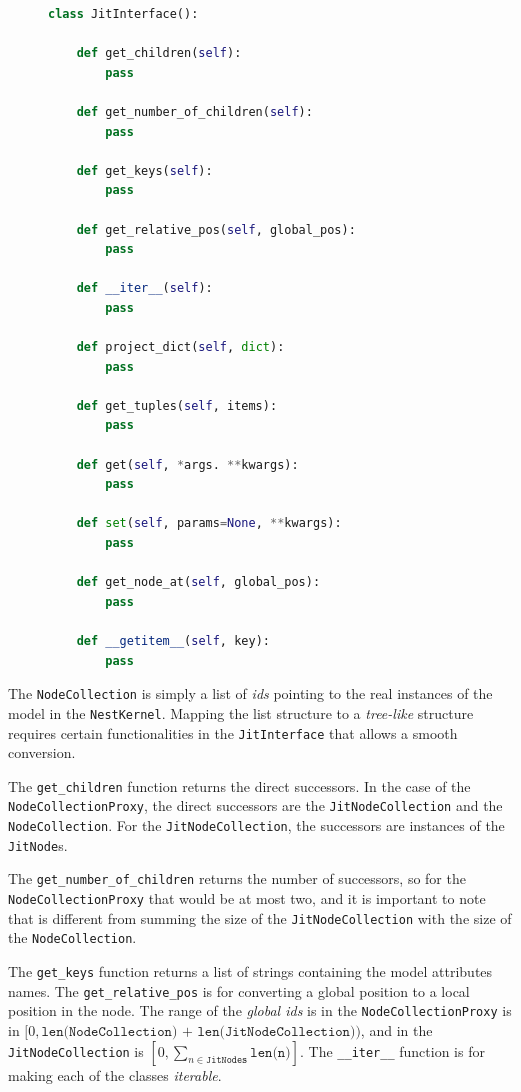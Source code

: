 \begin{figure}[ht!]
\centering
\begin{lstlisting}[language=Python, label=lst:jit_interface, caption={The JitInterface}]
class JitInterface():

    def get_children(self):
        pass
        
    def get_number_of_children(self):
        pass
    
    def get_keys(self):
        pass
    
    def get_relative_pos(self, global_pos):
        pass
        
    def __iter__(self):
        pass
        
    def project_dict(self, dict):
        pass
    
    def get_tuples(self, items):
        pass
        
    def get(self, *args. **kwargs):
        pass
        
    def set(self, params=None, **kwargs):
        pass
    
    def get_node_at(self, global_pos):
        pass
        
    def __getitem__(self, key):
        pass
\end{lstlisting}
\end{figure}


The \texttt{NodeCollection} is simply a list of \emph{ids} pointing to the real instances of the model in the \texttt{NestKernel}. Mapping the list structure to a \emph{tree-like} structure requires certain functionalities in the \texttt{JitInterface} that allows a smooth conversion.

The \texttt{get\_children} function returns the direct successors. In the case of the \texttt{NodeCollectionProxy}, the direct successors are the \texttt{JitNodeCollection} and the \texttt{NodeCollection}. For the \texttt{JitNodeCollection}, the successors are instances of the \texttt{JitNode}s.

The \texttt{get\_number\_of\_children} returns the number of successors, so for the \texttt{NodeCollectionProxy} that would be at most two, and it is important to note that is different from summing the size of the \texttt{JitNodeCollection} with the size of the \texttt{NodeCollection}. 

The \texttt{get\_keys} function returns a list of strings containing the model attributes names. The \texttt{get\_relative\_pos} is for converting a global position to a local position in the node. The range of the \emph{global ids} is in the \texttt{NodeCollectionProxy} is in $[0, \texttt{len(NodeCollection) + len(JitNodeCollection)})$, and in the \texttt{JitNodeCollection} is $[0,\sum_{n \in \texttt{JitNodes}} \texttt{len(n)}]$. The \texttt{\_\_iter\_\_} function is for making each of the classes \emph{iterable}. 

